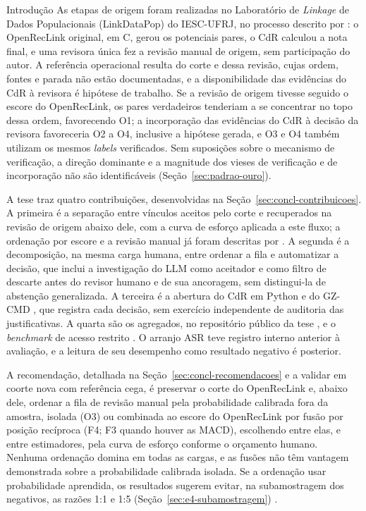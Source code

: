\begin{chapter}{Introdução}
As etapas de origem foram realizadas no Laboratório de \textit{Linkage} de Dados Populacionais (LinkDataPop) do IESC-UFRJ, no processo descrito por : o OpenRecLink original, em C, gerou os potenciais pares, o CdR calculou a nota final, e uma revisora única fez a revisão manual de origem, sem participação do autor. A referência operacional resulta do corte e dessa revisão, cujas ordem, fontes e parada não estão documentadas, e a disponibilidade das evidências do CdR à revisora é hipótese de trabalho. Se a revisão de origem tivesse seguido o escore do OpenRecLink, os pares verdadeiros tenderiam a se concentrar no topo dessa ordem, favorecendo O1; a incorporação das evidências do CdR à decisão da revisora favoreceria O2 a O4, inclusive a hipótese gerada, e O3 e O4 também utilizam os mesmos \textit{labels} verificados. Sem suposições sobre o mecanismo de verificação, a direção dominante e a magnitude dos vieses de verificação e de incorporação não são identificáveis (Seção~\ref{sec:padrao-ouro}).

A tese traz quatro contribuições, desenvolvidas na Seção~\ref{sec:concl-contribuicoes}. A primeira é a separação entre vínculos aceitos pelo corte e recuperados na revisão de origem abaixo dele, com a curva de esforço aplicada a este fluxo; a ordenação por escore e a revisão manual já foram descritas por . A segunda é a decomposição, na mesma carga humana, entre ordenar a fila e automatizar a decisão, que inclui a investigação do LLM como aceitador e como filtro de descarte antes do revisor humano e de sua ancoragem, sem distingui-la de abstenção generalizada. A terceira é a abertura do CdR em Python \cite{Jardim2025comparador} e do GZ-CMD \cite{Jardim2026gzcmd}, que registra cada decisão, sem exercício independente de auditoria das justificativas. A quarta são os agregados, no repositório público da tese \cite{Jardim2026phdrepo}, e o \textit{benchmark} de acesso restrito \cite{Jardim2026zenodoGzcmd}. O arranjo ASR teve registro interno anterior à avaliação, e a leitura de seu desempenho como resultado negativo é posterior.

A recomendação, detalhada na Seção~\ref{sec:concl-recomendacoes} e a validar em coorte nova com referência cega, é preservar o corte do OpenRecLink e, abaixo dele, ordenar a fila de revisão manual pela probabilidade calibrada fora da amostra, isolada (O3) ou combinada ao escore do OpenRecLink por fusão por posição recíproca (F4; F3 quando houver as MACD), escolhendo entre elas, e entre estimadores, pela curva de esforço conforme o orçamento humano. Nenhuma ordenação domina em todas as cargas, e as fusões não têm vantagem demonstrada sobre a probabilidade calibrada isolada. Se a ordenação usar probabilidade aprendida, os resultados sugerem evitar, na subamostragem dos negativos, as razões 1:1 e 1:5 (Seção~\ref{sec:e4-subamostragem}) \cite{Jardim2026phdrepo}.


\end{chapter}
